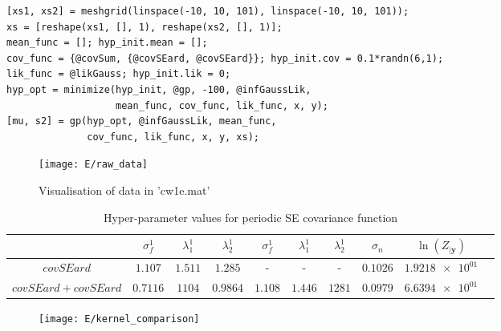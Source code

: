\documentclass[11pt]{article}
\begin{document}
\begin{lstlisting}[caption=Code to train and calculate prediction intervals of a 2D GP with SE ARD kernel, captionpos=b, basicstyle=\small]
[xs1, xs2] = meshgrid(linspace(-10, 10, 101), linspace(-10, 10, 101));
xs = [reshape(xs1, [], 1), reshape(xs2, [], 1)];
mean_func = []; hyp_init.mean = [];
cov_func = {@covSum, {@covSEard, @covSEard}}; hyp_init.cov = 0.1*randn(6,1);
lik_func = @likGauss; hyp_init.lik = 0;
hyp_opt = minimize(hyp_init, @gp, -100, @infGaussLik, 
                   mean_func, cov_func, lik_func, x, y);
[mu, s2] = gp(hyp_opt, @infGaussLik, mean_func, 
              cov_func, lik_func, x, y, xs);
\end{lstlisting}
\label{lst:E}

\begin{figure}[h]
    \centering
    \texttt{[image: E/raw\_data]}
    \caption{Visualisation of data in 'cw1e.mat'}
    \label{fig:E_data_vis}
\end{figure}

\begin{table}[h]
    \centering
    \begin{tabular}{|c|c|c|c|c|c|c|c|c|c|}
        \hline
         & $\sigma_f^1$ & $\lambda_1^1$ & $\lambda_2^1$ & $\sigma_f^1$ & $\lambda_1^1$ & $\lambda_2^1$ & $\sigma_n$ & $\ln(Z_{|\textbf{y}})$ \\
        \hline
        $covSEard$ & $1.107$ & $1.511$ & $1.285$ & - & - & - & $0.1026$ & $\num{1.9218e+01}$ \\ 
        $covSEard + covSEard$ & $0.7116$ & $1104$ & $0.9864$ & $1.108$ & $1.446$ & $1281$ & $0.0979$ & $\num{6.6394e+01}$ \\
        \hline
    \end{tabular}
    \caption{Hyper-parameter values for periodic SE covariance function}
    \label{table:E_hyper_parameters}
\end{table}

\begin{figure}[h]
    \centering
    \texttt{[image: E/kernel\_comparison]}
    \caption{}
    \label{fig:E_kernel_compare}
\end{figure}

    
\end{document}
